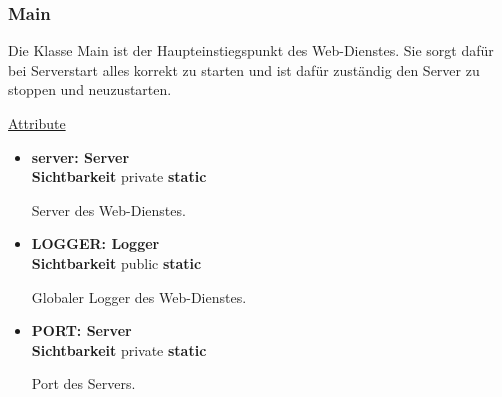 \subsubsection{Main} \label{service:klasse:Main}
Die Klasse Main ist der Haupteinstiegspunkt des Web-Dienstes. Sie sorgt dafür bei Serverstart alles korrekt zu starten und ist dafür zuständig den Server zu stoppen und neuzustarten.\newline

\underline{Attribute}
\begin{itemize}
\itemsep0pt
\item \textbf{server: Server} \hfill\\ 
\textbf{Sichtbarkeit} private \newline
\textbf{static}

Server des Web-Dienstes.

\item \textbf{LOGGER: Logger} \hfill\\ 
\textbf{Sichtbarkeit} public \newline
\textbf{static}

Globaler Logger des Web-Dienstes.

\item \textbf{PORT: Server} \hfill\\ 
\textbf{Sichtbarkeit} private \newline
\textbf{static}

Port des Servers.
\end{itemize}

